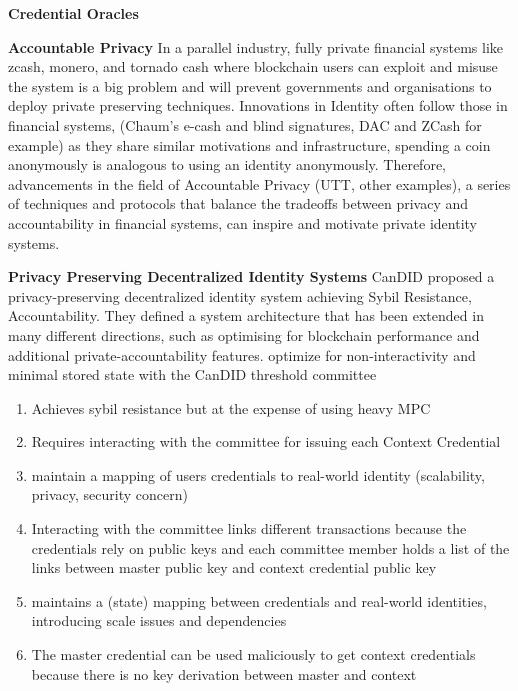 \noindent \textbf{Credential Oracles}


\noindent \textbf{Accountable Privacy}
In a parallel industry, fully private financial systems like zcash, monero, and tornado cash where blockchain users can exploit and misuse the system is a big problem and will prevent governments and organisations to deploy private preserving techniques. Innovations in Identity often follow those in financial systems, (Chaum's e-cash and blind signatures, DAC and ZCash for example) as they share similar motivations and infrastructure, spending a coin anonymously is analogous to using an identity anonymously. Therefore, advancements in the field of Accountable Privacy (UTT, other examples), a series of techniques and protocols that balance the tradeoffs between privacy and accountability in financial systems, can inspire and motivate private identity systems.

\noindent \textbf{Privacy Preserving Decentralized Identity Systems}
CanDID proposed a privacy-preserving decentralized identity system achieving Sybil Resistance, Accountability. 
They defined a system architecture that has been extended in many different directions, such as \cite{wang2023hades, rathee_zebra_2022} optimising for blockchain performance and additional private-accountability features. \cite{crites_syra_2024, rabaninejad_attribute-based_nodate} optimize for non-interactivity and minimal stored state with the CanDID threshold committee

\begin{enumerate}
    \item Achieves sybil resistance but at the expense of using heavy MPC
    \item Requires interacting with the committee for issuing each Context Credential
    \item maintain a mapping of users credentials to real-world identity (scalability, privacy, security concern)
    \item Interacting with the committee links different transactions because the credentials rely on public keys and each committee member holds a list of the links between master public key and context credential public key
    \item maintains a (state) mapping between credentials and real-world identities, introducing scale issues and dependencies
    \item The master credential can be used maliciously to get context credentials because there is no key derivation between master and context
\end{enumerate} 

